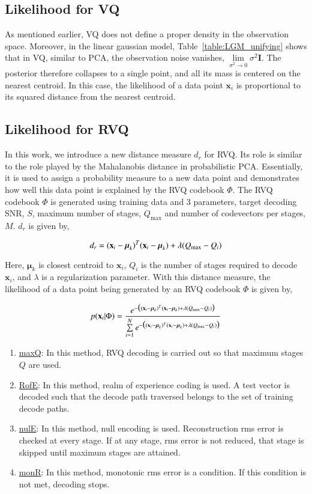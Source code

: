 \subsection{Likelihood for VQ}
As mentioned earlier, VQ does not define a proper density in the observation space.  Moreover, in the linear gaussian model, Table~\ref{table:LGM_unifying} shows that in VQ, similar to PCA, the observation noise vanishes, $\lim\limits_{\sigma^2 \rightarrow 0} \sigma^2\mathbf{I}$.  The posterior therefore collapses to a single point, and all its mass is centered on the nearest centroid.  In this case, the likelihood of a data point $\mathbf{x}_i$ is proportional to its squared distance from the nearest centroid.

\subsection{Likelihood for RVQ}
In this work, we introduce a new distance measure $d_r$ for RVQ.  Its role is similar to the role played by the Mahalanobis distance in probabilistic PCA.  Essentially, it is used to assign a probability measure to a new data point and demonstrates how well this data point is explained by the RVQ codebook $\Phi$.  The RVQ codebook $\Phi$ is generated using training data and 3 parameters, target decoding SNR, $S$, maximum number of stages, $Q_{\textrm{max}}$ and number of codevectors per stages, $M$.  $d_r$ is given by,




\begin{equation}
d_r = (\mathbf{x}_i-\boldsymbol\mu_k)^T(\mathbf{x}_i-\boldsymbol\mu_k) + \lambda({Q_{\textrm{max}}-Q_i})
\end{equation}

Here, $\boldsymbol\mu_k$ is closest centroid to $\mathbf{x}_i$, $Q_i$ is the number of stages required to decode $\mathbf{x}_i$, and $\lambda$ is a regularization parameter.  With this distance measure, the likelihood of a data point being generated by an RVQ codebook $\Phi$ is given by,

\begin{equation}
p(\mathbf{x}_i|\Phi) = \frac{e^{-\big((\mathbf{x}_i-\boldsymbol\mu_k)^T(\mathbf{x}_i-\boldsymbol\mu_k) + \lambda({Q_{\textrm{max}}-Q_i})\big)}} {\sum\limits_{i=1}^N e^{-\big((\mathbf{x}_i-\boldsymbol\mu_k)^T(\mathbf{x}_i-\boldsymbol\mu_k) + \lambda({Q_{\textrm{max}}-Q_i})\big)}}
\end{equation}

\begin{enumerate}
\item \underline{maxQ}: In this method, RVQ decoding is carried out so that maximum stages $Q$ are used.
\item \underline{RofE}: In this method, realm of experience coding is used.  A test vector is decoded such that the decode path traversed belongs to the set of training decode paths.
\item \underline{nulE}: In this method, null encoding is used.  Reconstruction rms error is checked at every stage.  If at any stage, rms error is not reduced, that stage is skipped until maximum stages are attained.
\item \underline{monR}: In this method, monotonic rms error is a condition.  If this condition is not met, decoding stops.
\end{enumerate}


